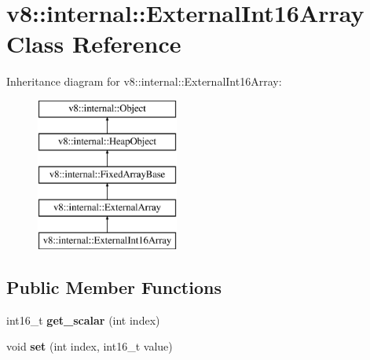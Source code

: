 \hypertarget{classv8_1_1internal_1_1_external_int16_array}{}\section{v8\+:\+:internal\+:\+:External\+Int16\+Array Class Reference}
\label{classv8_1_1internal_1_1_external_int16_array}
Inheritance diagram for v8\+:\+:internal\+:\+:External\+Int16\+Array\+:\begin{figure}[H]
\begin{center}
\leavevmode
\includegraphics[height=5.000000cm]{classv8_1_1internal_1_1_external_int16_array}
\end{center}
\end{figure}
\subsection*{Public Member Functions}
\begin{DoxyCompactItemize}
\item 
\hypertarget{classv8_1_1internal_1_1_external_int16_array_a46a8889799b93417b5874711916f27ec}{}int16\+\_\+t {\bfseries get\+\_\+scalar} (int index)\label{classv8_1_1internal_1_1_external_int16_array_a46a8889799b93417b5874711916f27ec}

\item 
\hypertarget{classv8_1_1internal_1_1_external_int16_array_a67f29a5f465340c0296c1f86e39d2e66}{}void {\bfseries set} (int index, int16\+\_\+t value)\label{classv8_1_1internal_1_1_external_int16_array_a67f29a5f465340c0296c1f86e39d2e66}

\end{DoxyCompactItemize}
